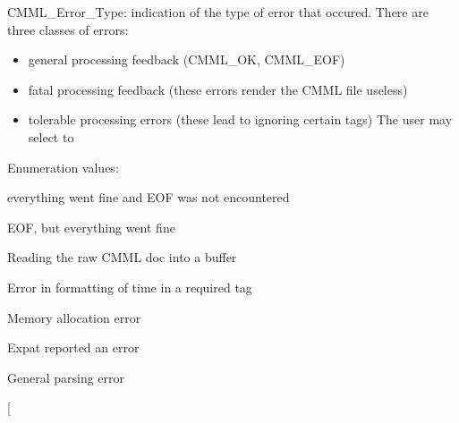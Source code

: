 CMML\_\-Error\_\-Type: indication of the type of error that occured. There are three classes of errors:\begin{itemize}
\item general processing feedback (CMML\_\-OK, CMML\_\-EOF)\item fatal processing feedback (these errors render the CMML file useless)\item tolerable processing errors (these lead to ignoring certain tags) The user may select to \end{itemize}
\begin{Desc}
\item[Enumeration values: ]\par
\begin{description}
\item[{\em 
CMML\_\-OK\label{cmml_8h_a114a19}
}]everything went fine and EOF was not encountered \item[{\em 
CMML\_\-EOF\label{cmml_8h_a114a20}
}]EOF, but everything went fine \item[{\em 
CMML\_\-READ\_\-ERROR\label{cmml_8h_a114a21}
}]Reading the raw CMML doc into a buffer \item[{\em 
CMML\_\-TIME\_\-ERROR\label{cmml_8h_a114a22}
}]Error in formatting of time in a required tag \item[{\em 
CMML\_\-MALLOC\_\-ERROR\label{cmml_8h_a114a23}
}]Memory allocation error \item[{\em 
CMML\_\-EXPAT\_\-ERROR\label{cmml_8h_a114a24}
}]Expat reported an error \item[{\em 
CMML\_\-PARSE\_\-ERROR\label{cmml_8h_a114a25}
}]General parsing error \item[{\em 
}
\end{description}
\end{Desc}
